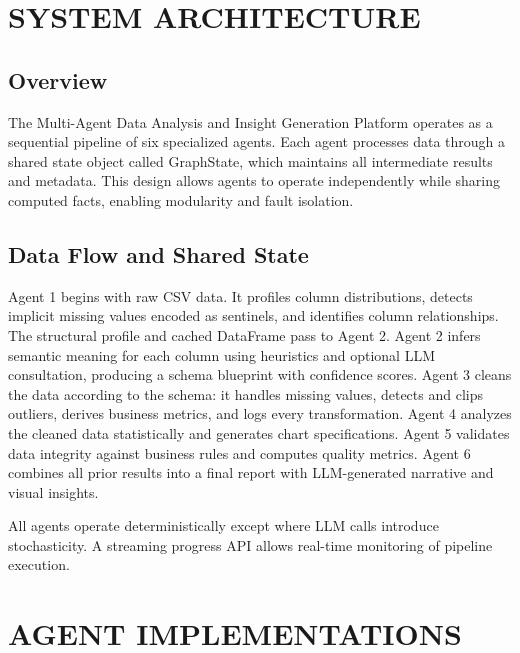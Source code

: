 \documentclass[12pt,a4paper,openany]{report}
\begin{document}
\chapter{SYSTEM ARCHITECTURE}
\label{ch:architecture}

\section{Overview}

The Multi-Agent Data Analysis and Insight Generation Platform operates as a sequential pipeline of six specialized agents. Each agent processes data through a shared state object called GraphState, which maintains all intermediate results and metadata. This design allows agents to operate independently while sharing computed facts, enabling modularity and fault isolation.

\section{Data Flow and Shared State}

Agent 1 begins with raw CSV data. It profiles column distributions, detects implicit missing values encoded as sentinels, and identifies column relationships. The structural profile and cached DataFrame pass to Agent 2. Agent 2 infers semantic meaning for each column using heuristics and optional LLM consultation, producing a schema blueprint with confidence scores. Agent 3 cleans the data according to the schema: it handles missing values, detects and clips outliers, derives business metrics, and logs every transformation. Agent 4 analyzes the cleaned data statistically and generates chart specifications. Agent 5 validates data integrity against business rules and computes quality metrics. Agent 6 combines all prior results into a final report with LLM-generated narrative and visual insights.

All agents operate deterministically except where LLM calls introduce stochasticity. A streaming progress API allows real-time monitoring of pipeline execution.

\chapter{AGENT IMPLEMENTATIONS}
\label{ch:agents}
\end{document}
